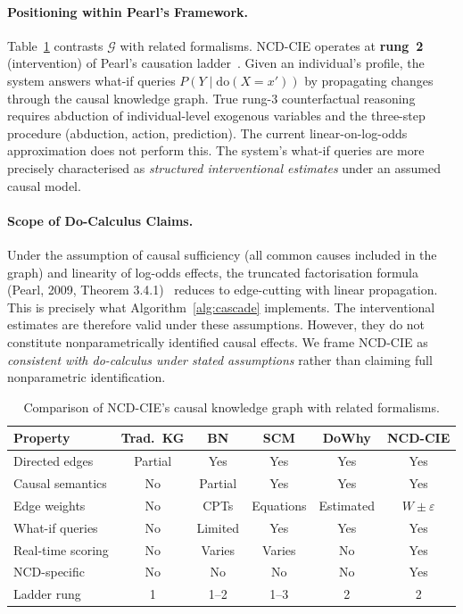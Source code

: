 \documentclass[runningheads]{llncs}
\begin{document}
\paragraph{Positioning within Pearl's Framework.}
Table~\ref{tab:comparison} contrasts $\mathcal{G}$ with related
formalisms.
NCD-CIE operates at \textbf{rung~2} (intervention) of Pearl's
causation ladder~\cite{pearl2018book}.
Given an individual's profile, the system answers what-if queries
$P(Y \mid \mathrm{do}(X = x'))$ by propagating changes through the
causal knowledge graph.
True rung-3 counterfactual reasoning requires abduction of
individual-level exogenous variables and the three-step procedure
(abduction, action, prediction).
The current linear-on-log-odds approximation does not perform this.
The system's what-if queries are more precisely characterised as
\emph{structured interventional estimates} under an assumed causal
model.

\paragraph{Scope of Do-Calculus Claims.}
Under the assumption of causal sufficiency (all common causes
included in the graph) and linearity of log-odds effects, the
truncated factorisation formula (Pearl, 2009, Theorem
3.4.1)~\cite{pearl2009causality} reduces to edge-cutting with
linear propagation.
This is precisely what Algorithm~\ref{alg:cascade} implements.
The interventional estimates are therefore valid under these
assumptions.
However, they do not constitute nonparametrically identified causal
effects.
We frame NCD-CIE as \emph{consistent with do-calculus under stated
assumptions} rather than claiming full nonparametric identification.

\renewcommand{\arraystretch}{1.2}
\begin{table}[t]
\centering
\caption{Comparison of NCD-CIE's causal knowledge graph with related formalisms.}
\label{tab:comparison}
\small
\begin{tabular}{@{}lccccc@{}}
\toprule
\textbf{Property} & \textbf{Trad.\ KG} & \textbf{BN} & \textbf{SCM} & \textbf{DoWhy} & \textbf{NCD-CIE} \\
\midrule
Directed edges       & Partial & Yes & Yes & Yes & Yes \\
Causal semantics     & No      & Partial & Yes & Yes & Yes \\
Edge weights         & No      & CPTs & Equations & Estimated & $W \pm \varepsilon$ \\
What-if queries      & No      & Limited & Yes & Yes & Yes \\
Real-time scoring    & No      & Varies & Varies & No & Yes \\
NCD-specific         & No      & No  & No  & No & Yes \\
Ladder rung          & 1       & 1--2 & 1--3 & 2  & 2 \\
\bottomrule
\end{tabular}
\end{table}
\renewcommand{\arraystretch}{1.0}
\end{document}
